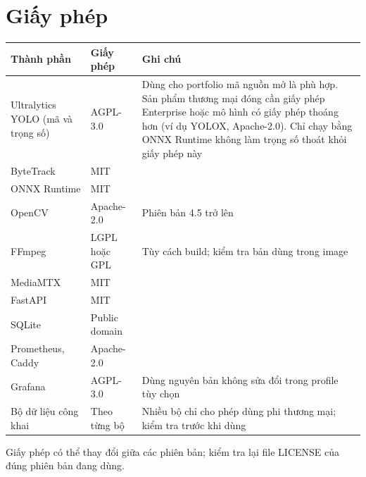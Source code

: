 \documentclass[10pt,a4paper,oneside,openany]{report}
\newcommand{\tabhead}[1]{\textsf{\bfseries\color{ink}#1}}
\newenvironment{bang}{\par\small\rowcolors{2}{rowgray}{white}}{\par\vspace{0.3em}}
\begin{document}
\section{Giấy phép}
\begin{bang}
\begin{tabularx}{\linewidth}{L{40mm}L{34mm}Y}
\toprule
\tabhead{Thành phần} & \tabhead{Giấy phép} & \tabhead{Ghi chú} \\
\midrule
Ultralytics YOLO (mã và trọng số) & AGPL-3.0 & Dùng cho portfolio mã nguồn mở là phù hợp. Sản phẩm thương mại đóng cần giấy phép Enterprise hoặc mô hình có giấy phép thoáng hơn (ví dụ YOLOX, Apache-2.0). Chỉ chạy bằng ONNX Runtime không làm trọng số thoát khỏi giấy phép này \\
ByteTrack & MIT & \\
ONNX Runtime & MIT & \\
OpenCV & Apache-2.0 & Phiên bản 4.5 trở lên \\
FFmpeg & LGPL hoặc GPL & Tùy cách build; kiểm tra bản dùng trong image \\
MediaMTX & MIT & \\
FastAPI & MIT & \\
SQLite & Public domain & \\
Prometheus, Caddy & Apache-2.0 & \\
Grafana & AGPL-3.0 & Dùng nguyên bản không sửa đổi trong profile tùy chọn \\
Bộ dữ liệu công khai & Theo từng bộ & Nhiều bộ chỉ cho phép dùng phi thương mại; kiểm tra trước khi dùng \\
\bottomrule
\end{tabularx}
\end{bang}
Giấy phép có thể thay đổi giữa các phiên bản; kiểm tra lại file LICENSE của đúng phiên bản đang dùng.

\end{document}

